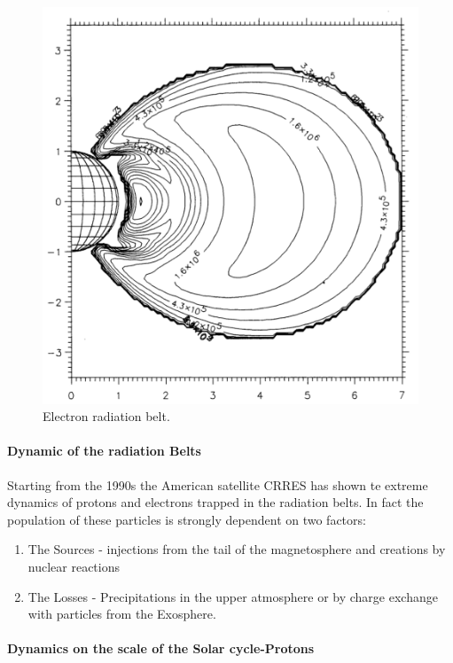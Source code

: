 \documentclass[./dissertation.tex]{subfiles}
\begin{document}
\begin{figure}[h!]
\centering
  \includegraphics[scale = 0.50]{imgs/radbelt4.png}
  \caption{Electron radiation belt. \cite{bib2}}
  \label{fig:radbel4}
\end{figure}
%
\paragraph{Dynamic of the radiation Belts}

Starting from the 1990s the American satellite CRRES has shown te extreme dynamics of protons and electrons trapped in the radiation belts. In fact the population of these particles is strongly dependent on two factors:
\begin{enumerate}
    \item The Sources - injections from the tail of the magnetosphere and creations by nuclear reactions
    \item The Losses - Precipitations in the upper atmosphere or by charge exchange with particles from the Exosphere. 
\end{enumerate}

\paragraph{Dynamics on the scale of the Solar cycle-Protons}
\end{document}
